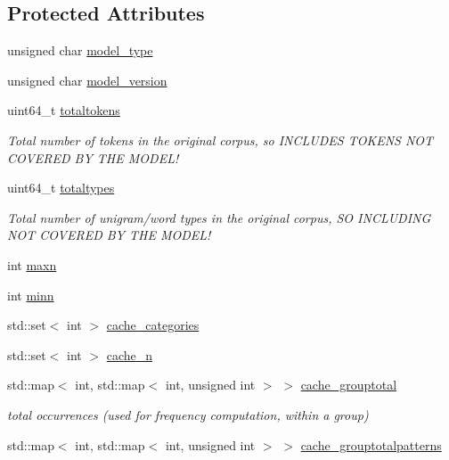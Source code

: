 \subsection*{Protected Attributes}
\begin{DoxyCompactItemize}
\item 
unsigned char \hyperlink{classPatternModel_afd14feab6f5cebac0b02232ce3adf44b}{model\+\_\+type}
\item 
unsigned char \hyperlink{classPatternModel_a512b5e8516c92983f95141d24d944f1d}{model\+\_\+version}
\item 
uint64\+\_\+t \hyperlink{classPatternModel_ada5d1db54c4e30a705aa13ce619e6d9a}{totaltokens}
\begin{DoxyCompactList}\small\item\em Total number of tokens in the original corpus, so I\+N\+C\+L\+U\+D\+E\+S T\+O\+K\+E\+N\+S N\+O\+T C\+O\+V\+E\+R\+E\+D B\+Y T\+H\+E M\+O\+D\+E\+L! \end{DoxyCompactList}\item 
uint64\+\_\+t \hyperlink{classPatternModel_a154c6d3c25265c2c8a40e9e78d4e09ed}{totaltypes}
\begin{DoxyCompactList}\small\item\em Total number of unigram/word types in the original corpus, S\+O I\+N\+C\+L\+U\+D\+I\+N\+G N\+O\+T C\+O\+V\+E\+R\+E\+D B\+Y T\+H\+E M\+O\+D\+E\+L! \end{DoxyCompactList}\item 
int \hyperlink{classPatternModel_a9403f8a6b15d7b5bcc8f12981dbc66ff}{maxn}
\item 
int \hyperlink{classPatternModel_a22933685f5f30ace6099d44e65c3efb7}{minn}
\item 
std\+::set$<$ int $>$ \hyperlink{classPatternModel_a2fa59bed9f90745782983b4041981b88}{cache\+\_\+categories}
\item 
std\+::set$<$ int $>$ \hyperlink{classPatternModel_a2ac397c0ba615b4ac11d7014bea8efcb}{cache\+\_\+n}
\item 
std\+::map$<$ int, std\+::map$<$ int, unsigned int $>$ $>$ \hyperlink{classPatternModel_a9a4c974fe564fcad7471b1e05e231394}{cache\+\_\+grouptotal}
\begin{DoxyCompactList}\small\item\em total occurrences (used for frequency computation, within a group) \end{DoxyCompactList}\item 
std\+::map$<$ int, std\+::map$<$ int, unsigned int $>$ $>$ \hyperlink{classPatternModel_abf5c303232c7fcd54bbd73125be4ca53}{cache\+\_\+grouptotalpatterns}

\end{DoxyCompactItemize}
